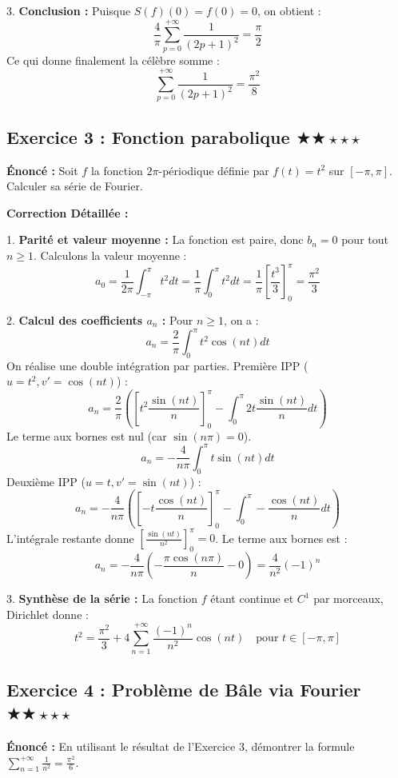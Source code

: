 \documentclass[11pt,a4paper]{article}
\begin{document}
3. \textbf{Conclusion :}
   Puisque $S(f)(0) = f(0) = 0$, on obtient :
   $$ \frac{4}{\pi} \sum_{p=0}^{+\infty} \frac{1}{(2p+1)^2} = \frac{\pi}{2} $$
   Ce qui donne finalement la célèbre somme :
   $$ \sum_{p=0}^{+\infty} \frac{1}{(2p+1)^2} = \frac{\pi^2}{8} $$


\subsection*{Exercice 3 : Fonction parabolique \quad $\bigstar\bigstar\star\star\star$}

\textbf{Énoncé :}
Soit $f$ la fonction $2\pi$-périodique définie par $f(t) = t^2$ sur $[-\pi, \pi]$. Calculer sa série de Fourier.

\textbf{Correction Détaillée :}

1. \textbf{Parité et valeur moyenne :}
   La fonction est paire, donc $b_n = 0$ pour tout $n \ge 1$.
   Calculons la valeur moyenne :
   $$ a_0 = \frac{1}{2\pi} \int_{-\pi}^\pi t^2 dt = \frac{1}{\pi} \int_0^\pi t^2 dt = \frac{1}{\pi} \left[ \frac{t^3}{3} \right]_0^\pi = \frac{\pi^2}{3} $$

2. \textbf{Calcul des coefficients $a_n$ :}
   Pour $n \ge 1$, on a :
   $$ a_n = \frac{2}{\pi} \int_0^\pi t^2 \cos(nt) dt $$
   On réalise une double intégration par parties.
   Première IPP ($u=t^2, v'=\cos(nt)$) :
   $$ a_n = \frac{2}{\pi} \left( \left[ t^2 \frac{\sin(nt)}{n} \right]_0^\pi - \int_0^\pi 2t \frac{\sin(nt)}{n} dt \right) $$
   Le terme aux bornes est nul (car $\sin(n\pi)=0$).
   $$ a_n = -\frac{4}{n\pi} \int_0^\pi t \sin(nt) dt $$
   Deuxième IPP ($u=t, v'=\sin(nt)$) :
   $$ a_n = -\frac{4}{n\pi} \left( \left[ -t \frac{\cos(nt)}{n} \right]_0^\pi - \int_0^\pi -\frac{\cos(nt)}{n} dt \right) $$
   L'intégrale restante donne $[\frac{\sin(nt)}{n^2}]_0^\pi = 0$. Le terme aux bornes est :
   $$ a_n = -\frac{4}{n\pi} \left( -\frac{\pi \cos(n\pi)}{n} - 0 \right) = \frac{4}{n^2} (-1)^n $$

3. \textbf{Synthèse de la série :}
   La fonction $f$ étant continue et $C^1$ par morceaux, Dirichlet donne :
   $$ t^2 = \frac{\pi^2}{3} + 4 \sum_{n=1}^{+\infty} \frac{(-1)^n}{n^2} \cos(nt) \quad \text{pour } t \in [-\pi, \pi] $$


\subsection*{Exercice 4 : Problème de Bâle via Fourier \quad $\bigstar\bigstar\star\star\star$}

\textbf{Énoncé :}
En utilisant le résultat de l'Exercice 3, démontrer la formule $\sum_{n=1}^{+\infty} \frac{1}{n^2} = \frac{\pi^2}{6}$.
\end{document}
